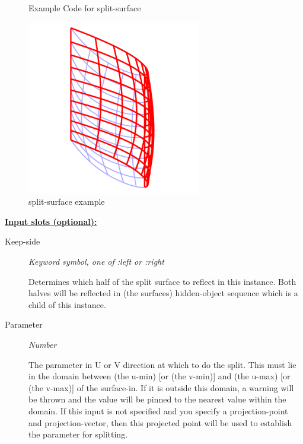 \documentclass [11pt]{book}
\begin{document}
\begin{itemize}
\begin{figure}
\caption{Example Code for split-surface}

\label{fig:example-code-split-surface}

\end{figure}

\begin{figure}
\begin{center}
\includegraphics[width=3in,height=3in]{../images/example-split-surface.pdf}
\end{center}

\caption{split-surface example}

\label{fig:split-surface}

\end{figure}





\textbf{
\underline{Input slots (optional):}}

\begin{description}

\item [Keep-side]
\emph{Keyword symbol, one of :left or :right}

 Determines which half of the split
surface to reflect in this instance. Both halves will be reflected in (the surfaces)
hidden-object sequence which is a child of this instance.




\item [Parameter]
\emph{Number}

 The parameter in U or V direction at which to do the split. This must
lie in the domain between (the u-min) [or (the v-min)] and (the u-max) [or (the v-max)]
of the surface-in. If it is outside this domain, a warning will be thrown and the
value will be pinned to the nearest value within the domain.
If this input is not specified and you specify a projection-point and projection-vector,
then this projected point will be used to establish the parameter for splitting.





\end{description}
\end{itemize}
\end{document}
